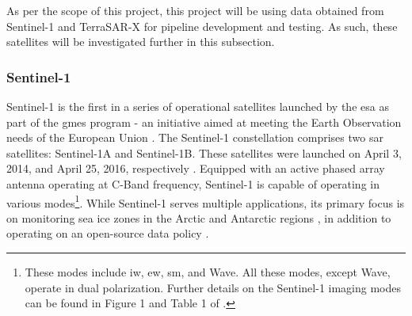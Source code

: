 As per the scope of this project, this project will be using data obtained from Sentinel-1 and TerraSAR-X for pipeline development and testing. As such, these satellites will be investigated further in this subsection.

\subsubsection{Sentinel-1} \label{sybsubsec:litReview.sarCharac.satellites.sentinel}


Sentinel-1 is the first in a series of operational satellites launched by the \ac{esa} as part of the \ac{gmes} program - an initiative aimed at meeting the Earth Observation needs of the European Union \cite{Attema2009}. The Sentinel-1 constellation comprises two \acs{sar} satellites: Sentinel-1A and Sentinel-1B. These satellites were launched on April 3, 2014, and April 25, 2016, respectively \cite{Geudtner2014, Potin2019}. Equipped with an active phased array antenna operating at C-Band frequency, Sentinel-1 is capable of operating in various modes\footnote{These modes include \acf{iw}, \acf{ew}, \acf{sm}, and Wave. All these modes, except Wave, operate in dual polarization. Further details on the Sentinel-1 imaging modes can be found in Figure 1 and Table 1 of \cite{Geudtner2014}.}. While Sentinel-1 serves multiple applications, its primary focus is on monitoring sea ice zones in the Arctic and Antarctic regions \cite{Attema2009, Geudtner2014}, in addition to operating on an open-source data policy \cite{Potin2019}.

